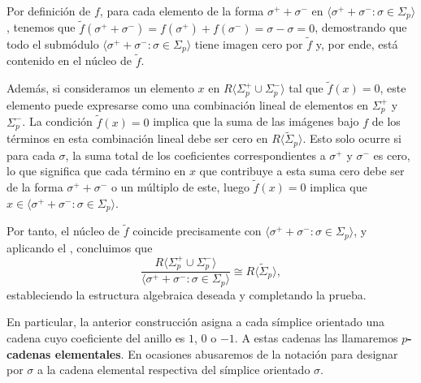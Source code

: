 Por definición de $f$, para cada elemento de la forma $\sigma^{+}+ \sigma^{-}$
en $\langle \sigma^{+}+ \sigma^{-}: \sigma \in \Sigma_{p}\rangle$, tenemos que $\tilde
{f}(\sigma^{+}+ \sigma^{-}) = f(\sigma^{+}) + f(\sigma^{-}) = \sigma - \sigma = 0$,
demostrando que todo el submódulo
$\langle \sigma^{+}+ \sigma^{-}: \sigma \in \Sigma_{p}\rangle$ tiene imagen cero
por $\tilde{f}$ y, por ende, está contenido en el núcleo de $\tilde{f}$.

Además, si consideramos un elemento $x$ en $R\langle \Sigma_{p}^{+}\cup \Sigma_{p}
^{-}\rangle$ tal que $\tilde{f}(x) = 0$, este elemento puede expresarse como una
combinación lineal de elementos en $\Sigma_{p}^{+}$ y $\Sigma_{p}^{-}$. La condición
$\tilde{f}(x) = 0$ implica que la suma de las imágenes bajo $f$ de los términos en
esta combinación lineal debe ser cero en $R \langle \tilde{\Sigma}_{p}\rangle$.
Esto solo ocurre si para cada $\sigma$, la suma total de los coeficientes correspondientes
a $\sigma^{+}$ y $\sigma^{-}$ es cero, lo que significa que cada término en $x$
que contribuye a esta suma cero debe ser de la forma $\sigma^{+}+ \sigma^{-}$ o
un múltiplo de este, luego $\tilde{f}(x) = 0$ implica que $x \in \langle \sigma^{+}
+ \sigma^{-}: \sigma \in \Sigma_{p}\rangle$.

Por tanto, el núcleo de $\tilde{f}$ coincide precisamente con
$\langle \sigma^{+}+ \sigma^{-}: \sigma \in \Sigma_{p}\rangle$, y aplicando el ,
concluimos que
\[
\frac{R\langle \Sigma_{p}^{+}\cup \Sigma_{p}^{-}\rangle}{\langle \sigma^{+}+
	\sigma^{-}: \sigma \in \Sigma_{p}\rangle}\cong R \langle \tilde{\Sigma}_{p}\rangle
,
\]
estableciendo la estructura algebraica deseada y completando la prueba.

\begin{observacion}
	En particular, la anterior construcción asigna a cada símplice orientado una
	cadena cuyo coeficiente del anillo es $1$, $0$ o $-1$. A estas cadenas las
	llamaremos \textbf{$p$-cadenas elementales}. En ocasiones abusaremos de la
	notación para designar por $\sigma$ a la cadena elemental respectiva del
	símplice orientado $\sigma$.
\end{observacion}

